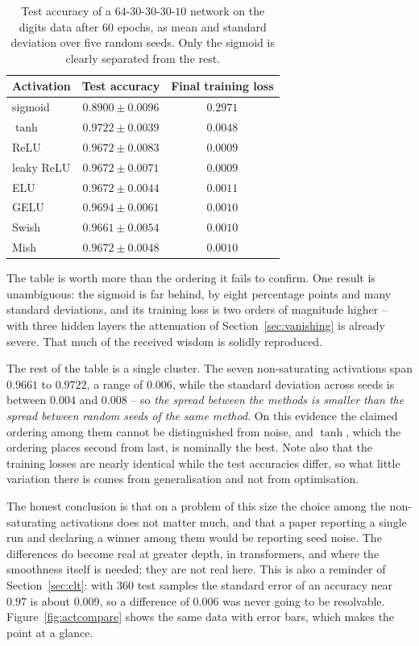 \begin{table}[htbp]
\centering
\renewcommand{\arraystretch}{1.2}
\setlength{\tabcolsep}{12pt}
\begin{tabular}{lcc}
\toprule
\textbf{Activation} & \textbf{Test accuracy} & \textbf{Final training loss}\\
\midrule
sigmoid     & $0.8900\pm0.0096$ & $0.2971$\\
$\tanh$      & $\mathbf{0.9722\pm0.0039}$ & $0.0048$\\
ReLU        & $0.9672\pm0.0083$ & $0.0009$\\
leaky ReLU  & $0.9672\pm0.0071$ & $0.0009$\\
ELU         & $0.9672\pm0.0044$ & $0.0011$\\
GELU        & $0.9694\pm0.0061$ & $0.0010$\\
Swish       & $0.9661\pm0.0054$ & $0.0010$\\
Mish        & $0.9672\pm0.0048$ & $0.0010$\\
\bottomrule
\end{tabular}
\caption{Test accuracy of a $64$-$30$-$30$-$30$-$10$ network on the digits data
after $60$ epochs, as mean and standard deviation over five random seeds.  Only
the sigmoid is clearly separated from the rest.}
\label{tab:actcompare}
\end{table}

The table is worth more than the ordering it fails to confirm.  One result is
unambiguous: the sigmoid is far behind, by eight percentage points and many
standard deviations, and its training loss is two orders of magnitude higher --
with three hidden layers the attenuation of Section~\ref{sec:vanishing} is
already severe.  That much of the received wisdom is solidly reproduced.

The rest of the table is a single cluster.  The seven non-saturating
activations span $0.9661$ to $0.9722$, a range of $0.006$, while the standard
deviation across seeds is between $0.004$ and $0.008$ -- so \emph{the spread
between the methods is smaller than the spread between random seeds of the same
method}.  On this evidence the claimed ordering among them cannot be
distinguished from noise, and $\tanh$, which the ordering places second from
last, is nominally the best.  Note also that the training losses are nearly
identical while the test accuracies differ, so what little variation there is
comes from generalisation and not from optimisation.

The honest conclusion is that on a problem of this size the choice among the
non-saturating activations does not matter much, and that a paper reporting a
single run and declaring a winner among them would be reporting seed noise.
The differences do become real at greater depth, in transformers, and where the
smoothness itself is needed; they are not real here.  This is also a reminder
of Section~\ref{sec:clt}: with $360$ test samples the standard error of an
accuracy near $0.97$ is about $0.009$, so a difference of $0.006$ was never
going to be resolvable.  Figure~\ref{fig:actcompare} shows the same data
with error bars, which makes the point at a glance.

